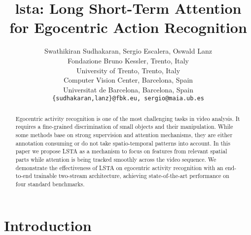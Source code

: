\documentclass[10pt,twocolumn,letterpaper]{article}
\begin{document}
\title{\acs{lsta}: Long Short-Term Attention
for Egocentric Action Recognition}




\author{Swathikiran Sudhakaran, Sergio Escalera, Oswald Lanz\\ Fondazione Bruno Kessler, Trento, Italy\\
	University of Trento, Trento, Italy\\
	Computer Vision Center, Barcelona, Spain\\
	Universitat de Barcelona, Barcelona, Spain\\
	{\tt\small \{sudhakaran,lanz\}@fbk.eu, \tt\small sergio@maia.ub.es}
}

\maketitle


\begin{abstract}
Egocentric activity recognition is one of the most challenging tasks in video analysis. It requires a fine-grained discrimination of small objects and their manipulation. While some methods base on strong supervision and attention mechanisms, they are either annotation consuming or do not take spatio-temporal patterns into account. In this paper we propose LSTA as a mechanism to focus on features from relevant spatial parts while attention is being tracked smoothly across the video sequence. We demonstrate the effectiveness of LSTA on egocentric activity recognition with an end-to-end trainable two-stream architecture, achieving state-of-the-art performance on four standard benchmarks.

\end{abstract}

\vspace{-0.5cm}
\section{Introduction}
\end{document}
